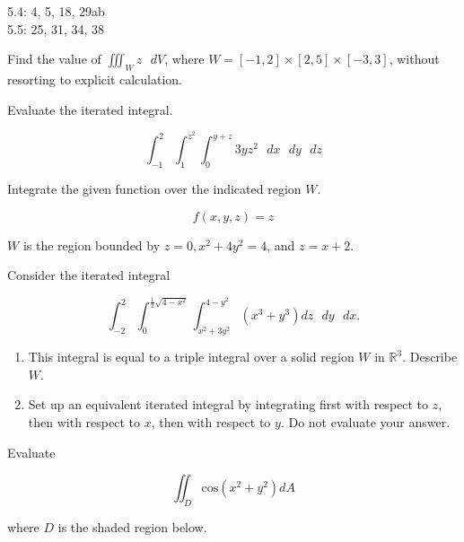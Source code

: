 \documentclass[11pt,letterpaper,boxed]{pset}
\begin{document}
    \begin{center}
    	5.4: 4, 5, 18, 29ab \\
    	5.5: 25, 31, 34, 38
    \end{center}
    
    \begin{problem} [5.4.4]
    	Find the value of $\iiint_W z \textrm{ } dV$, where $W=[-1,2] \times [2,5] \times [-3,3]$, without resorting to explicit calculation.
    \end{problem}
    \newpage
    
    
    \begin{problem} [5.4.5]
    	Evaluate the iterated integral.
    
    	\[\int_{-1}^2 \int_1^{z^2} \int_0^{y+z} 3yz^2 \textrm{ }dx\textrm{ }dy\textrm{ }dz\]
    
    \end{problem}
    \newpage
    
    
    \begin{problem} [5.4.18]
    	Integrate the given function over the indicated region $W$.
    
    	\[f(x,y,z)=z\]
    
    	$W$ is the region bounded by $z = 0, x^2 + 4y^2 = 4$, and $z = x + 2$. 
    \end{problem}
    \newpage
    
    
    \begin{problem} [5.4.29]
    	Consider the iterated integral
    
    	\[\int_{-2}^2 \int_0^{\frac12 \sqrt{4-x^2}} \int_{x^2+3y^2}^{4-y^2} 
    		(x^3+y^3) dz \textrm{ } dy \textrm{ } dx.\]
    
        \begin{enumerate}
            \item This integral is equal to a triple integral over a solid region $W$ in $\mathbb{R}^3$.
    		Describe $W$.
    		\item Set up an equivalent iterated integral by integrating first with respect to $z$, 
    		then with respect to $x$, then with respect to $y$. Do not evaluate your answer.
        \end{enumerate}
    \end{problem}
    \newpage
    
    \begin{problem} [5.5.25]
    	Evaluate 
    
    	\[\iint_D \textrm{cos} (x^2 + y^2)dA\]
    
    	where $D$ is the shaded region below.
    \end{problem}
    
\end{document}

